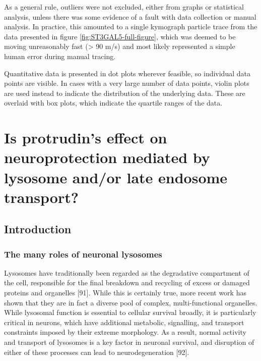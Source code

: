 \documentclass[
  12pt,
  a4paper,
]{book}
\renewcommand{\chaptermark}[1]{\markboth{#1}{}}
\begin{document}
As a general rule, outliers were not excluded, either from graphs or statistical analysis, unless there was some evidence of a fault with data collection or manual analysis. In practice, this amounted to a single kymograph particle trace from the data presented in figure \ref{fig:ST3GAL5-full-figure}, which was deemed to be moving unreasonably fast (\textgreater{} 90 \textmu{}m/s) and most likely represented a simple human error during manual tracing.

Quantitative data is presented in dot plots wherever feasible, so individual data points are visible. In cases with a very large number of data points, violin plots are used instead to indicate the distribution of the underlying data. These are overlaid with box plots, which indicate the quartile ranges of the data.

\hypertarget{is-protrudins-effect-on-neuroprotection-mediated-by-lysosome-andor-late-endosome-transport}{%
\chapter{Is protrudin's effect on neuroprotection mediated by lysosome and/or late endosome transport?}\label{is-protrudins-effect-on-neuroprotection-mediated-by-lysosome-andor-late-endosome-transport}}

\chaptermark{Lysosome and late endosome transport}

\hypertarget{introduction}{%
\section{Introduction}\label{introduction}}

\hypertarget{the-many-roles-of-neuronal-lysosomes}{%
\subsection{The many roles of neuronal lysosomes}\label{the-many-roles-of-neuronal-lysosomes}}

Lysosomes have traditionally been regarded as the degradative compartment of the cell, responsible for the final breakdown and recycling of excess or damaged proteins and organelles {[}91{]}. While this is certainly true, more recent work has shown that they are in fact a diverse pool of complex, multi-functional organelles. While lysosomal function is essential to cellular survival broadly, it is particularly critical in neurons, which have additional metabolic, signalling, and transport constraints imposed by their extreme morphology. As a result, normal activity and transport of lysosomes is a key factor in neuronal survival, and disruption of either of these processes can lead to neurodegeneration {[}92{]}.
\end{document}
